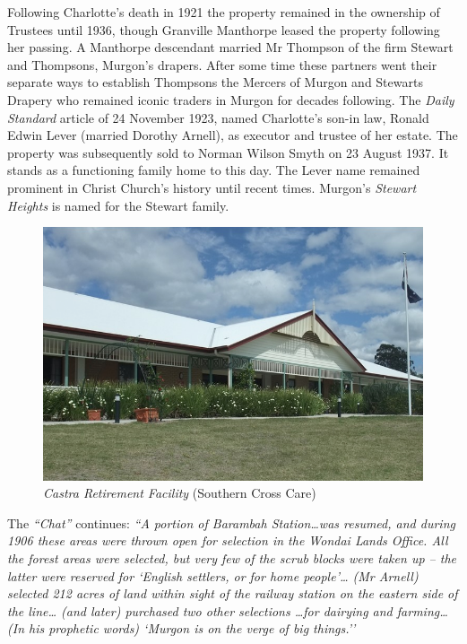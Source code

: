 Following Charlotte's death in 1921 the property remained in the ownership of Trustees until 1936, though Granville Manthorpe leased the property following her passing. A Manthorpe descendant married Mr Thompson of the firm Stewart and Thompsons, Murgon's drapers. After some time these partners went their separate ways to establish Thompsons the Mercers of Murgon and Stewarts Drapery who remained iconic traders in Murgon for decades following. The \emph{Daily Standard} article of 24 November 1923, named Charlotte's son-in law, Ronald Edwin Lever (married Dorothy Arnell), as executor and trustee of her estate. The property was subsequently sold to Norman Wilson Smyth on 23 August 1937. It stands as a functioning family home to this day. The Lever name remained prominent in Christ Church's history until recent times. Murgon's \emph{Stewart Heights} is named for the Stewart family.









\begin{figure}[!htb]
\begin{center}
\includegraphics[width=1.\textwidth,center]{../images/castraToday.png}
\caption{{\itshape Castra Retirement Facility} {\scriptsize(Southern Cross Care)}}
\end{center}
\end{figure}




\smallskip


The \emph{``Chat''} continues: \emph{``A portion of Barambah Station\ldots was resumed, and during 1906 these areas were thrown open for selection in the Wondai Lands Office. All the forest areas were selected, but very few of the scrub blocks were taken up -- the latter were reserved for `English settlers, or for home people'\ldots{} (Mr Arnell) selected 212 acres of land within sight of the railway station on the eastern side of the line\ldots{} (and later) purchased two other selections \ldots for dairying and farming\ldots(In his prophetic words) `Murgon is on the verge of big things.''}



